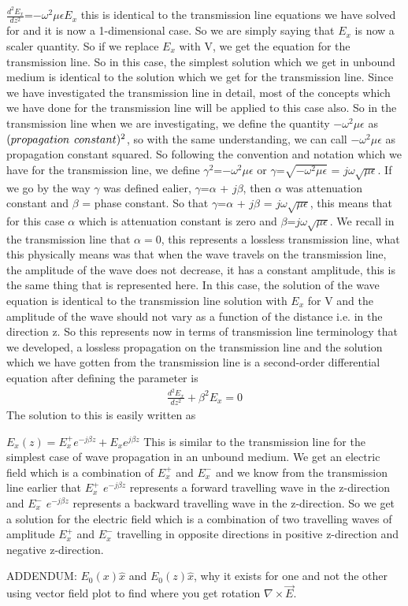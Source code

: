 $\frac{d^2 E_x}{d z^2}$=$-\omega^2\mu\epsilon E_{x}$ this is identical to the transmission line equations we have solved for and it is now a 1-dimensional case. So we are simply saying that $E_x$ is now a scaler quantity. So if we replace $E_x$ with V, we get the equation for the transmission line. So in this case, the simplest solution which we get in unbound medium is identical to the solution which we get for the transmission line. Since we have investigated the transmission line in detail, most of the concepts which we have done for the transmission line will be applied to this case also. So in the transmission line when we are investigating, we define the quantity $-\omega^2\mu\epsilon$ as $(propagation\hspace{0.15cm} constant)^2$, so with the same understanding, we can call $-\omega^2\mu\epsilon$ as propagation constant squared. So following the convention and notation which we have for the transmission line, we define $\gamma^2$=$-\omega^2\mu\epsilon$ or $\gamma$=$\sqrt{-\omega^2\mu\epsilon}$ = $j\omega\sqrt{\mu\epsilon}$. If we go by the way $\gamma$ was defined ealier, $\gamma$=$\alpha$ + $j\beta$, then $\alpha$ was attenuation constant and $\beta$ = phase constant. So that $\gamma$=$\alpha$ + $j\beta$ = $j\omega\sqrt{\mu\epsilon}$, this means that for this case $\alpha$ which is attenuation constant is zero and  $\beta$=$j\omega\sqrt{\mu\epsilon}$.
We recall in the transmission line that $\alpha=0$, this represents a lossless transmission line, what this physically means was that when the wave travels on the transmission line, the amplitude of the wave does not decrease, it has a constant amplitude, this is the same thing that is represented here. In this case, the solution of the wave equation is identical to the transmission line solution with $E_x$ for V and the amplitude of the wave should not vary as a function of the distance i.e. in the direction z. So this represents now in terms of transmission line terminology that we developed, a lossless propagation on the transmission line and the solution which we have gotten from the transmission line is a second-order differential equation after defining the parameter is
\begin{align}
\frac{d^2E_x}{dz^2}+\beta^2E_x=0
\end{align}
The solution to this is easily written as

$E_x(z)=E^+_xe^{-j\beta z}+E_xe^{j\beta z}$ This is similar to the transmission line for the simplest case of wave propagation in an unbound medium.
We get an electric field which is a combination of $E_x^+$ and $E_x^-$ and we know from the transmission line earlier that $E_x^+$ $e^{-j\beta z}$ represents a forward travelling wave in the z-direction and $E_x^-$ $e^{-j\beta z}$ represents a backward travelling wave in the z-direction. So we get a solution for the electric field which is a combination of two travelling waves of amplitude $E_x^+$ and $E_x^-$ travelling in opposite directions in positive z-direction and negative z-direction.

ADDENDUM: $E_0(x)\hat{x}$ and $E_0(z)\hat{x}$, why it exists for one and not the other using vector field plot to find where you get rotation $\nabla\times\vec{E}$.
